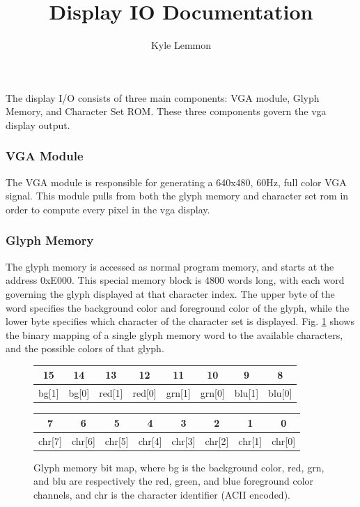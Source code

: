 \documentclass[../../ProjectDocumentation.tex]{subfiles}
\title{\textbf{Display IO Documentation}}
\author{Kyle Lemmon}
\date{}
\begin{document}
\maketitle

The display I/O consists of three main components: VGA module, Glyph Memory, and Character Set ROM. These three components govern the vga display output.

\subsubsection{VGA Module}
The VGA module is responsible for generating a 640x480, 60Hz, full color VGA signal. This module pulls from both the glyph memory and character set rom in order to compute every pixel in the vga display.



\subsubsection{Glyph Memory}
The glyph memory is accessed as normal program memory, and starts at the address 0xE000. This special memory block is 4800 words long, with each word governing the glyph displayed at that character index. The upper byte of the word specifies the background color and foreground color of the glyph, while the lower byte specifies which character of the character set is displayed. Fig. \ref{fig:glyphmem} shows the binary mapping of a single glyph memory word to the available characters, and the possible colors of that glyph.

\begin{figure}
\begin{tt}
\tiny
\begin{tabular}{|c|c|c|c|c|c|c|c|}
\multicolumn{1}{c}{15} & \multicolumn{1}{c}{14} & \multicolumn{1}{c}{13} & \multicolumn{1}{c}{12} &
\multicolumn{1}{c}{11} & \multicolumn{1}{c}{10} & \multicolumn{1}{c}{9} & \multicolumn{1}{c}{8}  \\
\hline
bg[1] & bg[0] & red[1] & red[0] & grn[1] & grn[0] & blu[1] & blu[0] \\
\hline
\end{tabular}

\begin{tabular}{|c|c|c|c|c|c|c|c|}
\multicolumn{1}{c}{7} & \multicolumn{1}{c}{6} & \multicolumn{1}{c}{5} & \multicolumn{1}{c}{4} &
\multicolumn{1}{c}{3} & \multicolumn{1}{c}{2} & \multicolumn{1}{c}{1} & \multicolumn{1}{c}{0} \\
\hline
chr[7] & chr[6] & chr[5] & chr[4] & chr[3] & chr[2] & chr[1] & chr[0] \\
\hline
\end{tabular}

\end{tt}

\caption{Glyph memory bit map, where bg is the background color, red, grn, and blu are respectively the red, green, and blue foreground color channels, and chr is the character identifier (ACII encoded).}
\label{fig:glyphmem}

\end{figure}
\end{document}
